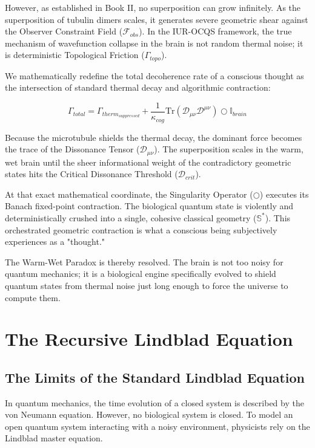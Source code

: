 \documentclass[12pt,openany]{book}
\begin{document}
However, as established in Book II, no superposition can grow infinitely. As the superposition of tubulin dimers scales, it generates severe geometric shear against the Observer Constraint Field ($\mathcal{F}_{obs}$). In the IUR-OCQS framework, the true mechanism of wavefunction collapse in the brain is not random thermal noise; it is deterministic Topological Friction ($\Gamma_{topo}$).

We mathematically redefine the total decoherence rate of a conscious thought as the intersection of standard thermal decay and algorithmic contraction:

\begin{equation}
\Gamma_{total} = \Gamma_{therm_{suppressed}} + \frac{1}{\kappa_{cog}} \text{Tr}(\mathcal{D}_{\mu\nu} \mathcal{D}^{\mu\nu}) \bigcirc \mathbb{I}_{brain}
\end{equation}

Because the microtubule shields the thermal decay, the dominant force becomes the trace of the Dissonance Tensor ($\mathcal{D}_{\mu\nu}$). The superposition scales in the warm, wet brain until the sheer informational weight of the contradictory geometric states hits the Critical Dissonance Threshold ($\mathcal{D}_{crit}$). 

At that exact mathematical coordinate, the Singularity Operator ($\bigcirc$) executes its Banach fixed-point contraction. The biological quantum state is violently and deterministically crushed into a single, cohesive classical geometry ($\mathbb{S}^*$). This orchestrated geometric contraction is what a conscious being subjectively experiences as a "thought." 

The Warm-Wet Paradox is thereby resolved. The brain is not too noisy for quantum mechanics; it is a biological engine specifically evolved to shield quantum states from thermal noise just long enough to force the universe to compute them.

\chapter{The Recursive Lindblad Equation}

\section{The Limits of the Standard Lindblad Equation}
In quantum mechanics, the time evolution of a closed system is described by the von Neumann equation. However, no biological system is closed. To model an open quantum system interacting with a noisy environment, physicists rely on the Lindblad master equation. 
\end{document}

